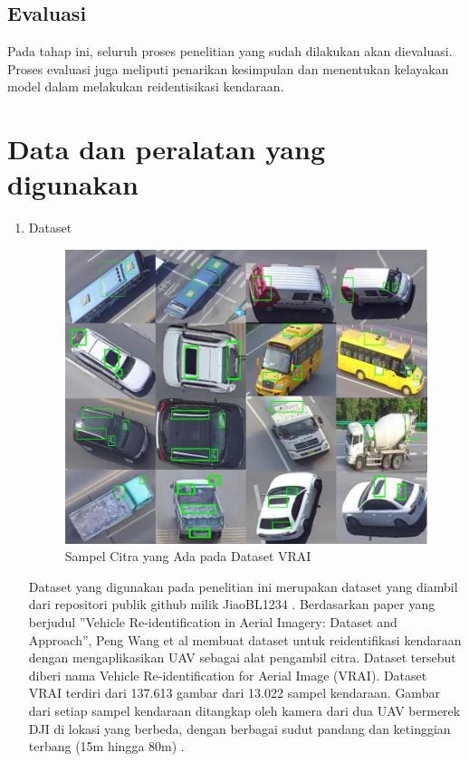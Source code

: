 \subsection{Evaluasi}

Pada tahap ini, seluruh proses penelitian yang sudah dilakukan akan dievaluasi. Proses evaluasi juga meliputi penarikan kesimpulan dan menentukan kelayakan model dalam melakukan reidentisikasi kendaraan.

\section{Data dan peralatan yang digunakan}

\begin{enumerate}[label=(\alph*)]
  \item Dataset
        \begin{figure} [ht] \centering
          \includegraphics[scale=0.4]{gambar/VRAI-dataset.png}
          \caption{Sampel Citra yang Ada pada Dataset VRAI}
          \label{fig:VRAIDatset}
        \end{figure}

        Dataset yang digunakan pada penelitian ini merupakan dataset yang diambil dari repositori publik github milik JiaoBL1234 \cite*{VRAIDatasetGithub}. Berdasarkan paper yang berjudul ”Vehicle Re-identification in Aerial Imagery: Dataset and Approach”, Peng Wang et al membuat dataset untuk reidentifikasi kendaraan dengan mengaplikasikan UAV sebagai alat pengambil citra. Dataset tersebut diberi nama Vehicle Re-identification for Aerial Image (VRAI). Dataset VRAI terdiri dari 137.613 gambar dari 13.022 sampel kendaraan. Gambar dari setiap sampel kendaraan ditangkap oleh kamera dari dua UAV bermerek DJI di lokasi yang berbeda, dengan berbagai sudut pandang dan ketinggian terbang (15m hingga 80m) \cite{Wang2019vehicle}.


\end{enumerate}
